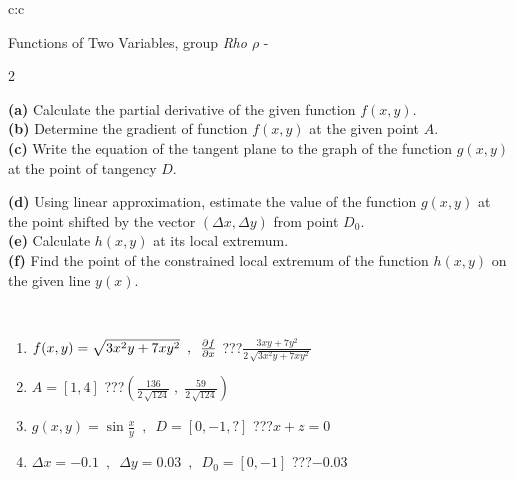\documentclass[10pt]{report}
\begin{document}
\begin{tabular}{c:c}
\begin{minipage}[c][104.5mm][t]{0.5\linewidth}
\begin{center}
\vspace{7mm}
{\huge \LARGE Functions of Two Variables, group \textit{Rho $\rho$} -}\\[5mm]
\begin{minipage}{0.95\linewidth}
\begin{center}
{\small \begin{multicols}{2} \raggedright
\textbf{(a)} Calculate the partial derivative of the given function \(f(x,y)\). \\[1mm]
\textbf{(b)} Determine the gradient of function \(f(x,y)\) at the given point \(A\). \\[1mm]
\textbf{(c)} Write the equation of the tangent plane to the graph of the function \(g(x,y)\) at the point of tangency \(D\). \par \columnbreak
\textbf{(d)} Using linear approximation, estimate the value of the function \(g(x,y)\) at the point shifted by the vector \((\Delta x, \Delta y)\) from point \(D_0\). \\[1mm]
\textbf{(e)} Calculate \(h(x,y)\) at its local extremum. \\[1mm]
\textbf{(f)} Find the point of the constrained local extremum of the function \(h(x,y)\) on the given line \(y(x)\). \\[1mm]
\end{multicols}
}
\end{center}
\end{minipage}
\\[4mm]
\begin{minipage}{0.79\linewidth}
\begin{center}
\begin{varwidth}{\linewidth}
\begin{enumerate}
\normalsizerr
\item $f(x,y) = \sqrt{3x^2y + 7xy^2}\enspace , \enspace \pdv{f}{x}$\quad \dotfill\; ???\;\dotfill \quad $\frac{3xy+7y^2}{2\,\sqrt{3x^2y+7xy^2}}$
\item $A = [1, 4]$\quad \dotfill\; ???\;\dotfill \quad $\left( \frac{136}{2\,\sqrt{124}} \;,\; \frac{59}{2\,\sqrt{124}} \right)$
\item $g(x,y) = \sin\frac{x}{y} \enspace , \enspace D = [0, -1, ?]$\quad \dotfill\; ???\;\dotfill \quad $x+z=0$
\item $\Delta x = {-0.1} \enspace,\enspace \Delta y = {0.03} \enspace,\enspace D_0 = [0,-1]$\quad \dotfill\; ???\;\dotfill \quad $-0.03$

\end{enumerate}
\end{varwidth}
\end{center}
\end{minipage}
\end{center}
\end{minipage}
\end{tabular}
\end{document}
